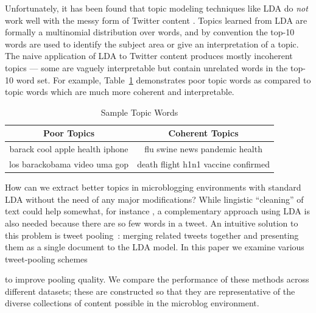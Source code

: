 \documentclass{sig-alternate}
\begin{document}
Unfortunately, it has been found that topic modeling techniques like
LDA do \emph{not} work well with the messy form of Twitter content
\cite{wayne}.  Topics learned from LDA are formally a multinomial
distribution over words, and by convention the top-10 words are used
to identify the subject area or give an interpretation of a topic.
The naive application of LDA to Twitter content produces mostly
incoherent topics --- some are vaguely interpretable but contain
unrelated words in the top-10 word set.  For example,
Table~\ref{tbl-0} demonstrates poor topic words as compared to topic
words which are much more coherent and interpretable.
\begin{table}%
\centering
\caption{Sample Topic Words}\label{tbl-0}
\resizebox{8.5cm}{!} 
{
	\begin{tabular}{|c|c|}
	\hline
        Poor Topics  & Coherent Topics \\
\hline
 {\small barack cool apple health iphone}
 &
 {\small flu swine news pandemic health}\\
 {\small los barackobama video uma gop} & {\small death flight h1n1 vaccine confirmed} \\
 \hline
	\end{tabular}
}\vspace*{-10pt}
\end{table}


How can we extract better topics in
microblogging environments with standard LDA without the need of any
major modifications?  
While lingistic ``cleaning'' of text could help somewhat,
for instance  \cite{Han2012},  a complementary approach 
using LDA is also needed because there are so few words in a tweet.
An intuitive solution to this problem is tweet
pooling~\cite{Weng2010wsdm,hong}: merging related tweets together and presenting them as a single document to the LDA model.  
In this paper we examine various tweet-pooling schemes to improve pooling quality.  We compare
the performance of these methods across different datasets; these are
constructed so that they are representative of the diverse collections
of content possible in the microblog environment.  
\end{document}
